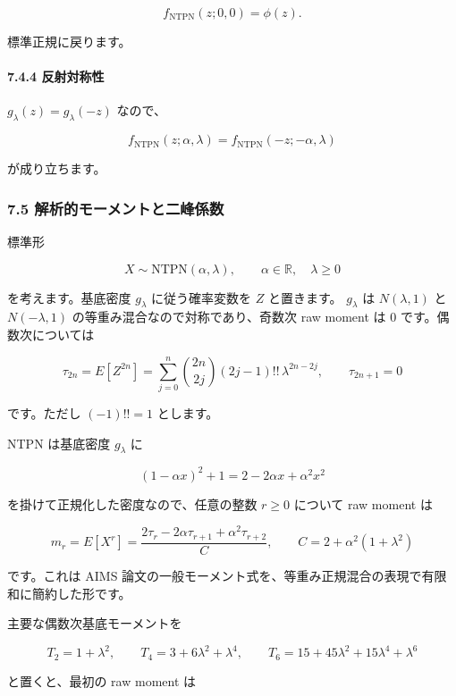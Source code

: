 \documentclass[
]{article}
\begin{document}
\[
f_{\mathrm{NTPN}}(z;0,0)=\phi(z).
\]

標準正規に戻ります。

\hypertarget{ux53cdux5c04ux5bfeux79f0ux6027}{%
\paragraph{7.4.4 反射対称性}\label{ux53cdux5c04ux5bfeux79f0ux6027}}

\(g_\lambda(z)=g_\lambda(-z)\) なので、

\[
f_{\mathrm{NTPN}}(z;\alpha,\lambda)
=f_{\mathrm{NTPN}}(-z;-\alpha,\lambda)
\]

が成り立ちます。

\hypertarget{ux89e3ux6790ux7684ux30e2ux30fcux30e1ux30f3ux30c8ux3068ux4e8cux5cf0ux4fc2ux6570-1}{%
\subsubsection{7.5
解析的モーメントと二峰係数}\label{ux89e3ux6790ux7684ux30e2ux30fcux30e1ux30f3ux30c8ux3068ux4e8cux5cf0ux4fc2ux6570-1}}

標準形

\[
X\sim\mathrm{NTPN}(\alpha,\lambda),
\qquad
\alpha\in\mathbb{R},\quad \lambda\ge0
\]

を考えます。基底密度 \(g_\lambda\) に従う確率変数を \(Z\) と置きます。
\(g_\lambda\) は \(N(\lambda,1)\) と \(N(-\lambda,1)\)
の等重み混合なので対称であり、奇数次 raw moment は 0
です。偶数次については

\[
\tau_{2n}=E[Z^{2n}]
=
\sum_{j=0}^{n}
\binom{2n}{2j}(2j-1)!!\,\lambda^{2n-2j},
\qquad
\tau_{2n+1}=0
\]

です。ただし \((-1)!!=1\) とします。

NTPN は基底密度 \(g_\lambda\) に

\[
(1-\alpha x)^2+1=2-2\alpha x+\alpha^2x^2
\]

を掛けて正規化した密度なので、任意の整数 \(r\ge0\) について raw moment
は

\[
\boxed{
m_r=E[X^r]
=
\frac{
2\tau_r-2\alpha\tau_{r+1}+\alpha^2\tau_{r+2}
}{C}
},
\qquad
C=2+\alpha^2(1+\lambda^2)
\]

です。これは AIMS
論文の一般モーメント式を、等重み正規混合の表現で有限和に簡約した形です。

主要な偶数次基底モーメントを

\[
T_2=1+\lambda^2,
\qquad
T_4=3+6\lambda^2+\lambda^4,
\qquad
T_6=15+45\lambda^2+15\lambda^4+\lambda^6
\]

と置くと、最初の raw moment は
\end{document}
